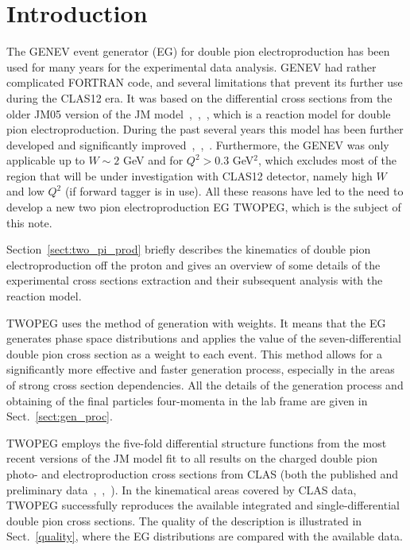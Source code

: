 

\newpage
\chapter{Introduction}
\mbox{}\vspace{-\baselineskip}



The GENEV event generator (EG) for double pion electroproduction has been used for many years for the experimental data analysis. GENEV had rather complicated FORTRAN code, and several limitations that prevent its further use during the CLAS12 era. It was based on the differential cross sections from the older JM05 version of the JM model~\cite{Mokeev:2005re},~\cite{Aznauryan:2005tp},~\cite{Ripani:2000va}, which is a reaction model for double pion electroproduction. During the past several years this model has been further developed and significantly improved~\cite{Mokeev:2008iw},~\cite{Mokeev:2012vsa},~\cite{Mokeev:2015lda}. Furthermore,  the GENEV was only applicable up to $W \sim 2$ GeV and for $Q^2 > 0.3$ GeV$^2$, which excludes most of the region that will be under investigation with CLAS12 detector, namely high $W$ and low $Q^2$ (if forward tagger is in use). All these reasons have led to the need to develop a new two pion electroproduction EG TWOPEG, which is the subject of this note.


Section~\ref{sect:two_pi_prod} briefly describes the kinematics of double pion electroproduction off the proton and gives an overview of some details of the experimental cross sections extraction and their subsequent analysis with the reaction model.

TWOPEG uses the method of generation with weights. It means that the EG generates phase space distributions and applies the value of the seven-differential double pion cross section as a weight to each event. This method allows for a significantly more effective and faster generation process, especially in the areas of strong cross section dependencies. All the details of the generation process and obtaining of the final particles four-momenta in the lab frame are given in Sect.~\ref{sect:gen_proc}.

TWOPEG employs the five-fold differential structure functions from the most recent versions of the JM model fit to all results on the charged double pion photo- and electroproduction cross sections from CLAS (both the published and preliminary data~\cite{Ripani:2002ss},~\cite{Fedotov:2008aa},~\cite{Golovach:note}). In the kinematical areas covered by CLAS data, TWOPEG successfully reproduces the available integrated and single-differential double pion cross sections. The quality of the description is illustrated in Sect.~\ref{quality}, where the EG distributions are compared with the available data.

